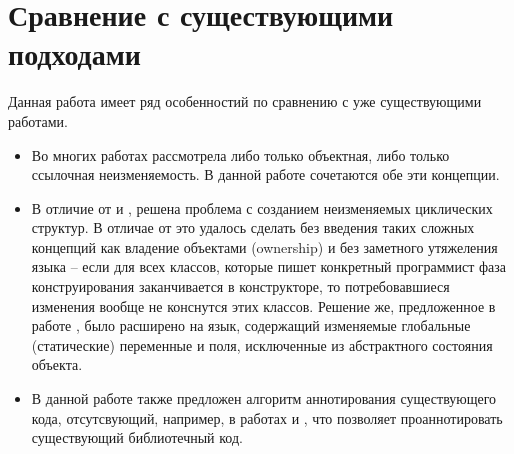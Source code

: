 \section{Сравнение с существующими подходами}

Данная работа имеет ряд особенностий по сравнению с уже существующими работами. 

\begin{itemize}
	\item Во многих работах рассмотрела либо только объектная, либо только ссылочная неизменяемость. В данной работе сочетаются обе эти концепции.
	\item В отличие от \cite{Gordon2012} и \cite{Zibin2007}, решена проблема с созданием неизменяемых циклических структур. В отличае от \cite{Potanin} это удалось сделать без введения таких сложных концепций как владение объектами (ownership) и без заметного утяжеления языка -- если для всех классов, которые пишет конкретный программист фаза конструирования заканчивается в конструкторе, то потребовавшиеся изменения вообще не конснутся этих классов. Решение же, предложенное в работе \cite{Potanin}, было расширено на язык, содержащий изменяемые глобальные (статические) переменные и поля, исключенные из абстрактного состояния объекта.
	\item В данной работе также предложен алгоритм аннотирования существующего кода, отсутсвующий, например, в работах \cite{Zibin2007} и \cite{Potanin}, что позволяет проаннотировать существующий библиотечный код.  
\end{itemize}

























